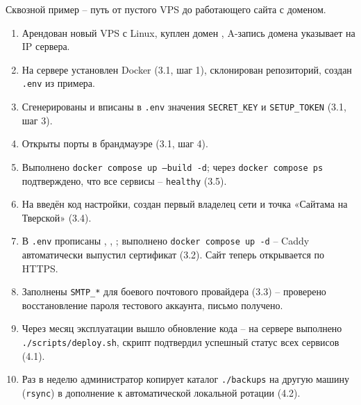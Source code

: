 Сквозной пример -- путь от пустого VPS до работающего сайта с доменом.

\begin{enumerate}
  \item Арендован новый VPS с Linux, куплен домен
        , A-запись домена указывает на IP
        сервера.
  \item На сервере установлен Docker (3.1, шаг 1), склонирован
        репозиторий, создан \texttt{.env} из примера.
  \item Сгенерированы и вписаны в \texttt{.env} значения
        \texttt{SECRET\_KEY} и \texttt{SETUP\_TOKEN} (3.1, шаг 3).
  \item Открыты порты в брандмауэре (3.1, шаг 4).
  \item Выполнено \texttt{docker compose up --build -d}; через
        \texttt{docker compose ps} подтверждено, что все сервисы --
        \texttt{healthy} (3.5).
  \item На  введён код настройки, создан
        первый владелец сети и точка «Сайтама на Тверской» (3.4).
  \item В \texttt{.env} прописаны ,
        , ;
        выполнено \texttt{docker compose
        up -d} -- Caddy автоматически выпустил сертификат (3.2).
        Сайт теперь открывается по HTTPS.
  \item Заполнены \texttt{SMTP\_*} для боевого почтового провайдера
        (3.3) -- проверено восстановление пароля тестового аккаунта,
        письмо получено.
  \item Через месяц эксплуатации вышло обновление кода -- на сервере
        выполнено \texttt{./scripts/deploy.sh}, скрипт подтвердил
        успешный статус всех сервисов (4.1).
  \item Раз в неделю администратор копирует каталог \texttt{./backups}
        на другую машину (\texttt{rsync}) в дополнение к автоматической
        локальной ротации (4.2).
\end{enumerate}


